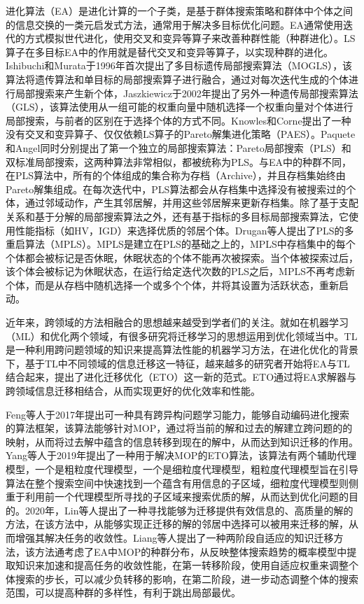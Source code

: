 进化算法（EA）是进化计算的一个子类，是基于群体搜索策略和群体中个体之间的信息交换的一类元启发式方法，通常用于解决多目标优化问题。EA通常使用迭代的方式模拟世代进化，使用交叉和变异等算子来改善种群性能（种群进化）。LS算子在多目标EA中的作用就是替代交叉和变异等算子，以实现种群的进化。Ishibuchi和Murata于1996年首次提出了多目标遗传局部搜索算法（MOGLS）\cite{ishibuchi1996multi}，该算法将遗传算法和单目标的局部搜索算子进行融合，通过对每次迭代生成的个体进行局部搜索来产生新个体，Jaszkiewicz于2002年提出了另外一种遗传局部搜索算法（GLS）\cite{jaszkiewicz2002genetic}，该算法使用从一组可能的权重向量中随机选择一个权重向量对个体进行局部搜索，与前者的区别在于选择个体的方式不同。Knowles和Corne提出了一种没有交叉和变异算子、仅仅依赖LS算子的Pareto解集进化策略（PAES）\cite{knowles1999pareto,knowles2000approximating}。Paquete\cite{paquete2004pareto}和Angel\cite{angel2004approximating}同时分别提出了第一个独立的局部搜索算法：Pareto局部搜索（PLS）和双标准局部搜索，这两种算法非常相似，都被统称为PLS。与EA中的种群不同，在PLS算法中，所有的个体组成的集合称为存档（Archive），并且存档集始终由Pareto解集组成。在每次迭代中，PLS算法都会从存档集中选择没有被搜索过的个体，通过邻域动作，产生其邻居解，并用这些邻居解来更新存档集。除了基于支配关系和基于分解的局部搜索算法之外，还有基于指标的多目标局部搜索算法\cite{basseur2007indicator}，它使用性能指标（如HV，IGD）来选择优质的邻居个体。Drugan等人提出了PLS的多重启算法（MPLS）\cite{drugan2012stochastic}。MPLS是建立在PLS的基础之上的，MPLS中存档集中的每个个体都会被标记是否休眠，休眠状态的个体不能再次被探索。当个体被探索过后，该个体会被标记为休眠状态，在运行给定迭代次数的PLS之后，MPLS不再考虑新个体，而是从存档中随机选择一个或多个个体，并将其设置为活跃状态，重新启动。

近年来，跨领域的方法相融合的思想越来越受到学者们的关注。就如在机器学习（ML）和优化两个领域，有很多研究将迁移学习的思想运用到优化领域当中。TL是一种利用跨问题领域的知识来提高算法性能的机器学习方法，在进化优化的背景下，基于TL中不同领域的信息迁移这一特征，越来越多的研究者开始将EA与TL结合起来，提出了进化迁移优化（ETO）这一新的范式。ETO通过将EA求解器与跨领域信息迁移相结合，从而实现更好的优化效率和性能。

Feng等人于2017年提出可一种具有跨异构问题学习能力，能够自动编码进化搜索的算法框架\cite{feng2017autoencoding}，该算法能够针对MOP，通过将当前的解和过去的解建立跨问题的的映射，从而将过去解中蕴含的信息转移到现在的解中，从而达到知识迁移的作用。Yang等人于2019年提出了一种用于解决MOP的ETO算法\cite{yang2019offline}，该算法有两个辅助代理模型，一个是粗粒度代理模型，一个是细粒度代理模型，粗粒度代理模型旨在引导算法在整个搜索空间中快速找到一个蕴含有用信息的子区域，细粒度代理模型则侧重于利用前一个代理模型所寻找的子区域来搜索优质的解，从而达到优化问题的目的。2020年，Lin等人提出了一种寻找能够为迁移提供有效信息的、高质量的解的方法\cite{lin2020effective}，在该方法中，从能够实现正迁移的解的邻居中选择可以被用来迁移的解，从而增强其解决任务的收敛性。Liang等人提出了一种两阶段自适应的知识迁移方法\cite{liang2020two}，该方法通考虑了EA中MOP的种群分布，从反映整体搜索趋势的概率模型中提取知识来加速和提高任务的收敛性能，在第一转移阶段，使用自适应权重来调整个体搜索的步长，可以减少负转移的影响，在第二阶段，进一步动态调整个体的搜索范围，可以提高种群的多样性，有利于跳出局部最优。

